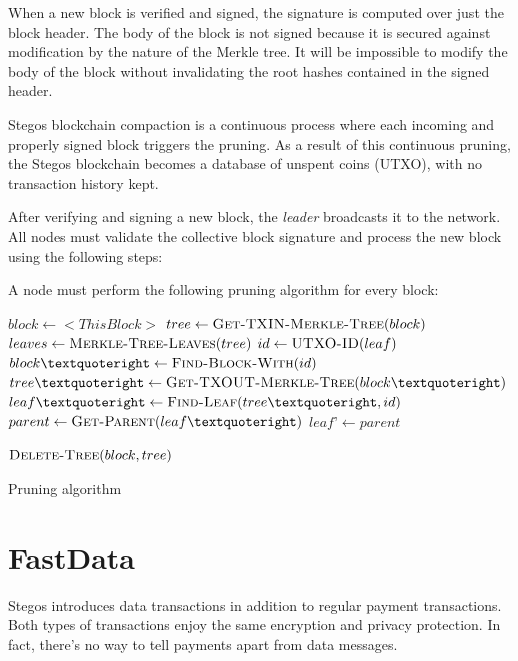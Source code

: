 \documentclass[8pt,fleqn,openany]{book}
\begin{document}
When a new block is verified and signed, the signature is computed over just the block header. The body of the block is not signed because it is secured against modification by the nature of the Merkle tree. It will be impossible to modify the body of the block without invalidating the root hashes contained in the signed header.

Stegos blockchain compaction is a continuous process where each incoming and properly signed block triggers the pruning. As a result of this continuous pruning, the Stegos blockchain becomes a database of unspent coins (UTXO), with no transaction history kept.

After verifying and signing a new block, the \textit{leader} broadcasts it to the network. All nodes must validate the collective block signature and process the new block using the following steps:

A node must perform the following pruning algorithm for every block:

\begin{algorithm}
\begin{algorithmic}
\State $block \gets <This Block>$
\State $tree \gets \Call{Get-TXIN-Merkle-Tree}{block}$
\State $leaves \gets \Call{Merkle-Tree-Leaves}{tree}$
	\State $id \gets \Call{UTXO-ID}{leaf}$
	\State $block’ \gets \Call{Find-Block-With}{id}$
	\State $tree’ \gets \Call{Get-TXOUT-Merkle-Tree}{block’}$
	\State $leaf’ \gets \Call{Find-Leaf}{tree’, id}$
	\State {} 
		\State $parent \gets \Call{Get-Parent}{leaf’}$
		\State {}
		\State {} 
		\State {}
		\State $leaf’ \gets parent$
	\EndFor
\EndFor

	\State $\Call{Delete-Tree}{block, tree}$ 
\EndIf

\end{algorithmic}
\caption{Pruning algorithm}
\label{code:pruning}
\end{algorithm}

\section{FastData}\label{sec:fastdata}
Stegos introduces data transactions in addition to regular payment transactions. Both types of transactions enjoy the same encryption and privacy protection. In fact, there’s no way to tell payments apart from data messages. 
\end{document}
